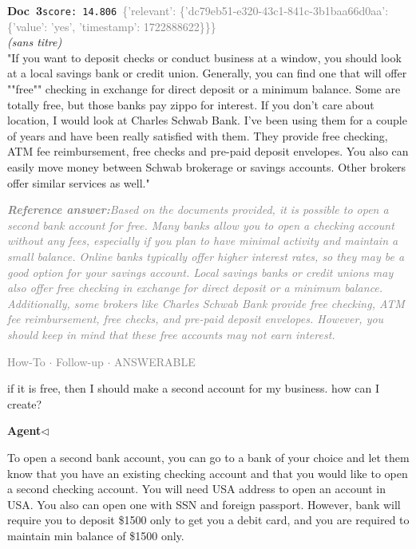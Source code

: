 \documentclass[a4paper,11pt]{article}
\begin{document}
\begin{docenv}
{\footnotesize\textcolor{doccolor}{\textbf{Doc~3}}}\hfill{\tiny\texttt{score:~14.806}}\ {\tiny\textcolor{gray}{\{'relevant': \{'dc79eb51-e320-43c1-841c-3b1baa66d0aa': \{'value': 'yes', 'timestamp': 1722888622\}\}\}}}\\[3pt]
{\small\textit{(sans titre)}}\\[2pt]
\vspace{2pt}
{\footnotesize 
"If you want to deposit checks or conduct business at a window, you should look at a local savings bank or credit union. Generally, you can find one that will offer ""free"" checking in exchange for direct deposit or a minimum balance. Some are totally free, but those banks pay zippo for interest. If you don't care about location, I would look at Charles Schwab Bank. I've been using them for a couple of years and have been really satisfied with them. They provide free checking, ATM fee reimbursement, free checks and pre-paid deposit envelopes. You also can easily move money between Schwab brokerage or savings accounts. Other brokers offer similar services as well."}
\end{docenv}
\begin{refanswerenv}
{\footnotesize\textit{\textcolor{gray}{\textbf{Reference answer:}\enspace Based on the documents provided, it is possible to open a second bank account for free. Many banks allow you to open a checking account without any fees, especially if you plan to have minimal activity and maintain a small balance. Online banks typically offer higher interest rates, so they may be a good option for your savings account. Local savings banks or credit unions may also offer free checking in exchange for direct deposit or a minimum balance. Additionally, some brokers like Charles Schwab Bank provide free checking, ATM fee reimbursement, free checks, and pre-paid deposit envelopes. However, you should keep in mind that these free accounts may not earn interest.}}}
\end{refanswerenv}
\vspace{0.5em}
\hfill{\tiny\textcolor{gray}{How-To $\cdot$ Follow-up $\cdot$ ANSWERABLE}}
\begin{userbubble}
if it is free, then I should make a second account for my business. how can I create?
\end{userbubble}
\noindent\hfill{\small\textcolor{agentcolor}{\textbf{Agent\enspace$\triangleleft$}}}
\begin{agentbubble}
To open a second bank account, you can go to a bank of your choice and let them know that you have an existing checking account and that you would like to open a second checking account. You will need USA address to open an account in USA. You also can open one with SSN and foreign passport. However, bank will require you to deposit \$1500 only to get you a debit card, and you are required to maintain min balance of \$1500 only.
\end{agentbubble}
\end{document}
